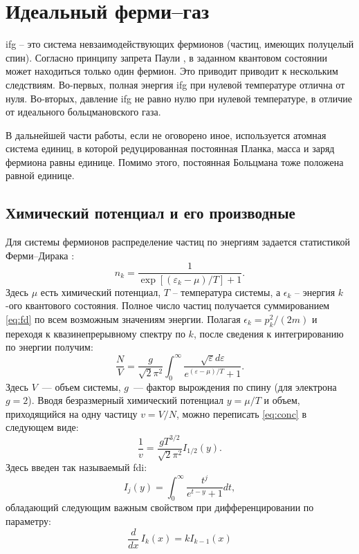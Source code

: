 
\chapter{Идеальный ферми--газ}
\acrfull{ifg} -- это система невзаимодействующих фермионов (частиц, имеющих полуцелый спин).
Согласно принципу запрета Паули \cite{Pauli:ZP:1925,Pauli:PR:1940}, в заданном квантовом состоянии может находиться только один фермион.
Это приводит приводит к нескольким следствиям.
Во-первых, полная энергия \acrshort{ifg} при нулевой температуре отлична от нуля.
Во-вторых, давление \acrshort{ifg} не равно нулю при нулевой температуре, в отличие от идеального больцмановского газа.

В дальнейшей части работы, если не оговорено иное, используется атомная система единиц, в которой редуцированная постоянная Планка, масса и заряд фермиона равны единице.
Помимо этого, постоянная Больцмана тоже положена равной единице.

\section{Химический потенциал и его производные}
Для системы фермионов распределение частиц по энергиям задается статистикой Ферми--Дирака \cite{Landau:statmech:1958}:
\begin{equation}
    n_k = \frac{1}{\exp{[(\varepsilon_k - \mu)/T]} + 1}.
    \label{eq:fd}
\end{equation}
Здесь $\mu$ есть химический потенциал, $T$ -- температура системы, а $\epsilon_k$ -- энергия $k$-ого квантового состояния.
Полное число частиц получается суммированием \eqref{eq:fd} по всем возможным значениям энергии.
Полагая $\epsilon_k = p^2_{k} / (2m)$ и переходя к квазинепрерывному спектру по $k$, после сведения к интегрированию по энергии получим:
\begin{equation}
    \label{eq:conc}
    \frac{N}{V}=\frac{g}{\sqrt{2} \pi^{2}} \int_{0}^{\infty} \frac{\sqrt{\varepsilon} d \varepsilon}{e^{(\varepsilon-\mu) / T}+1}.
\end{equation}
Здесь $V$~--- объем системы, $g$~--- фактор вырождения по спину (для электрона $g = 2$).
Вводя безразмерный химический потенциал $y = \mu / T$ и объем, приходящийся на одну частицу $v = V / N$, можно переписать \eqref{eq:conc} в следующем виде:
\begin{equation}
    \frac{1}{v} = \frac{g T^{3/2}}{\sqrt{2}\pi^2}I_{1/2}(y).
    \label{eq:mu_equation}
\end{equation}
Здесь введен так называемый \gls{fdi}:
\begin{equation}
    \label{eq:fermi-dirak_integral_definition}
    I_{j}(y)= \int_{0}^{\infty} \frac{t^{j}}{e^{t-y}+1} dt,
\end{equation}
обладающий следующим важным свойством при дифференцировании по параметру:
\begin{equation}
    \label{eq:ifg_diff_rule}
    \frac{d}{dx}\, I_k (x) = k I _{k-1} (x)
\end{equation}


